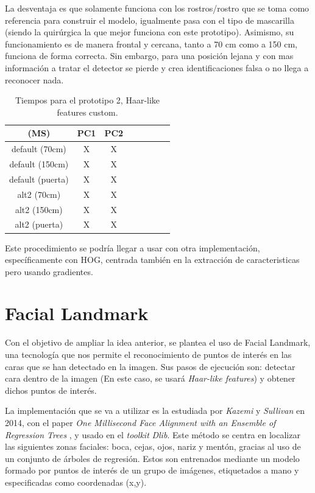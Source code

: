 La desventaja es que solamente funciona con los rostros/rostro que se toma como referencia para construir el modelo, igualmente pasa con el tipo de mascarilla (siendo la quirúrgica la que mejor funciona con este prototipo). Asimismo, su funcionamiento es de manera frontal y cercana, tanto a 70 cm como a 150 cm, funciona de forma correcta. Sin embargo, para una posición lejana y con mas información a tratar el detector se pierde y crea identificaciones falsa o no llega a reconocer nada.

\begin{table}[h!]
	\begin{center}
		\begin{tabular}{ |c|c|c|c|c|c|c|c| } 
			\hline
			(MS) & PC1 & PC2 \\
			\hline
			default (70cm) & X  & X  \\
			\hline
			default (150cm) & X  & X \\
			\hline
			default (puerta) & X  & X \\
			\hline
			alt2 (70cm) & X  & X  \\
			\hline
			alt2 (150cm) & X  & X \\
			\hline
			alt2 (puerta) & X  & X \\
			\hline
		\end{tabular}
		\caption{Tiempos para el prototipo 2, Haar-like features custom.}
		\label{tab:table3}
	\end{center}
\end{table}

Este procedimiento se podría llegar a usar con otra implementación, específicamente con HOG, centrada también en la extracción de caracteristicas pero usando gradientes.

\newpage
\section{Facial Landmark}

Con el objetivo de ampliar la idea anterior, se plantea el uso de Facial Landmark, una tecnología que nos permite el reconocimiento de puntos de interés en las caras que se han detectado en la imagen. Sus pasos de ejecución son: detectar cara dentro de la imagen (En este caso, se usará \textit{Haar-like features}) y obtener dichos puntos de interés.

La implementación que se va a utilizar es la estudiada por \textit{Kazemi} y \textit{Sullivan} en 2014, con el paper \textit{One Millisecond Face Alignment with an Ensemble of Regression Trees} \cite{inproceedings}, y usado en el \textit{toolkit} \textit{Dlib}. Este método se centra en localizar las siguientes zonas faciales: boca, cejas, ojos, nariz y mentón, gracias al uso de un conjunto de árboles de regresión. Estos son entrenados mediante  un modelo formado por puntos de interés de un grupo de imágenes, etiquetados a mano y especificadas como coordenadas (x,y). 

